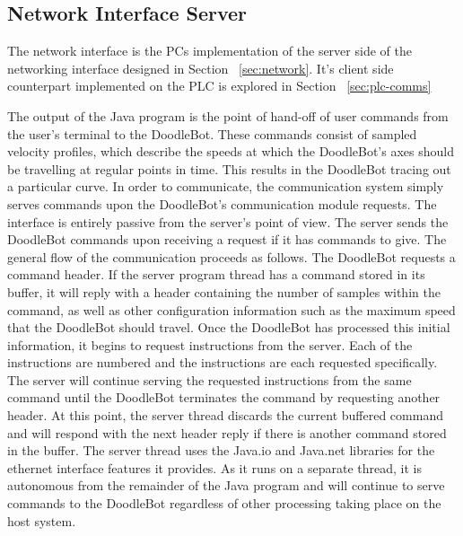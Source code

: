 \subsection{Network Interface Server}
\label{sec:pc-network}
The network interface is the PCs implementation of the server side of the networking interface designed in Section ~\ref{sec:network}. It's client side counterpart implemented on the PLC is explored in Section ~\ref{sec:plc-comms}

The output of the Java program is the point of hand-off of user commands from the user's terminal to the DoodleBot. These commands consist of sampled velocity profiles, which describe the speeds at which the DoodleBot's axes should be travelling at regular points in time. This results in the DoodleBot tracing out a particular curve. In order to communicate, the communication system simply serves commands upon the DoodleBot's communication module requests. The interface is entirely passive from the server's point of view. The server sends the DoodleBot commands upon receiving a request if it has commands to give. The general flow of the communication proceeds as follows. The DoodleBot requests a command header. If the server program thread has a command stored in its buffer, it will reply with a header containing the number of samples within the command, as well as other configuration information such as the maximum speed that the DoodleBot should travel. Once the DoodleBot has processed this initial information, it begins to request instructions from the server. Each of the instructions are numbered and the instructions are each requested specifically. The server will continue serving the requested instructions from the same command until the DoodleBot terminates the command by requesting another header. At this point, the server thread discards the current buffered command and will respond with the next header reply if there is another command stored in the buffer.
The server thread uses the Java.io and Java.net libraries for the ethernet interface features it provides. As it runs on a separate thread, it is autonomous from the remainder of the Java program and will continue to serve commands to the DoodleBot regardless of other processing taking place on the host system.